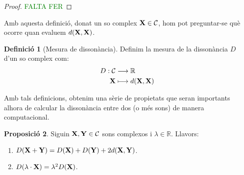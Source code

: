 \documentclass{article}
\theoremstyle{definition}
\newtheorem{definition}{Definició}[section]
\newtheorem{prop}[definition]{Proposició}
\newcommand{\0}{\ensuremath{\vb{0}}}
\newcommand{\X}{\ensuremath{\vb{X}}}
\newcommand{\Y}{\ensuremath{\vb{Y}}}
\newcommand{\RR}{\ensuremath{\mathbb{R}}} %
\begin{document}
\begin{proof}
    \textcolor{green}{FALTA FER}
\end{proof}
Amb aquesta definició, donat un so complex $\X\in\mathcal{C}$, hom pot preguntar-se què ocorre quan evaluem $d(\X,\X)$.
\begin{definition}[Mesura de dissonància]
    Definim la mesura de la dissonància $D$ d'un so complex com:
    \begin{align*}
        D:\mathcal{C}&\longrightarrow\RR\\
        \X&\longmapsto d(\X,\X)
    \end{align*}
\end{definition}
Amb tals definicions, obtenim una sèrie de propietats que seran importants alhora de calcular la dissonància entre dos (o més sons) de manera computacional.
\begin{prop}
    Siguin $\X,\Y\in\mathcal{C}$ sons complexos i $\lambda\in\RR$. Llavors:
    \begin{enumerate}
        \item $D(\X+\Y)=D(\X)+D(\Y)+2d(\X,\Y)$.
        \item $D(\lambda\cdot \X)=\lambda^2D(\X)$.
    \end{enumerate}
\end{prop}
\end{document}
